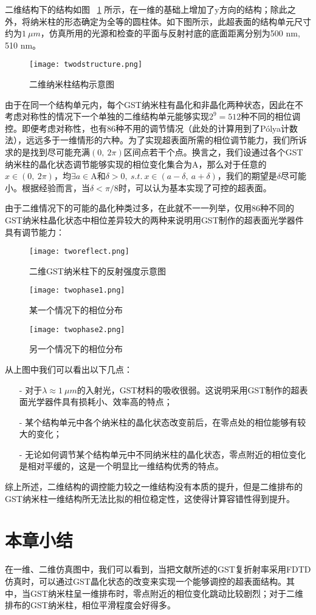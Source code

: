 二维结构下的结构如图 ~\ref{fig:twodim} 所示，在一维的基础上增加了y方向的结构；除此之外，将纳米柱的形态确定为全等的圆柱体。如下图所示，此超表面的结构单元尺寸约为$1\ \mu m$，仿真所用的光源和检查的平面与反射衬底的底面距离分别为500 nm, 510 nm。
\begin{figure}[H] %
  \centering
  \texttt{[image: twodstructure.png]}
  \caption{二维纳米柱结构示意图}
  \label{fig:twodim}
\end{figure}

由于在同一个结构单元内，每个GST纳米柱有晶化和非晶化两种状态，因此在不考虑对称性的情况下一个单独的二维结构单元能够实现$2^9=512$种不同的相位调控。即便考虑对称性，也有86种不用的调节情况（此处的计算用到了P\'olya计数法），远远多于一维情形的六种。为了实现超表面所需的相位调节能力，我们所诉求的是找到尽可能充满$\left (0,\ 2\pi \right )$区间点若干个点。换言之，我们设通过各个GST纳米柱的晶化状态调节能够实现的相位变化集合为A，那么对于任意的$x \in \left (0,\ 2\pi \right )$，均$\exists a \in \mathrm{A}\textrm{和}\delta > 0,\ s.t.\ x \in \left (a - \delta,\ a + \delta \right )$，我们的期望是$\delta$尽可能小。根据经验而言，当$\delta < \pi / 8$时，可以认为基本实现了可控的超表面。

由于二维情况下的可能的晶化种类过多，在此就不一一列举，仅用86种不同的GST纳米柱晶化状态中相位差异较大的两种来说明用GST制作的超表面光学器件具有调节能力：
\begin{figure}[h]
\begin{minipage}{0.3\textwidth}
  \centering
  \texttt{[image: tworeflect.png]}
  \caption{二维GST纳米柱下的反射强度示意图}
  \label{fig:parallel1}
\end{minipage}\hfill
\begin{minipage}{0.3\textwidth}
  \centering
  \texttt{[image: twophase1.png]}
  \caption{某一个情况下的相位分布}
  \label{fig:parallel2}
\end{minipage}\hfill
\begin{minipage}{0.3\textwidth}
  \centering
  \texttt{[image: twophase2.png]}
  \caption{另一个情况下的相位分布}
  \label{fig:parallel2}
\end{minipage}
\end{figure}

从上图中我们可以看出以下几点：
\begin{itemize}
  \item[-] 对于$\lambda \approx 1\ \mu m$的入射光，GST材料的吸收很弱。这说明采用GST制作的超表面光学器件具有损耗小、效率高的特点；
  \item[-] 某个结构单元中各个纳米柱的晶化状态改变前后，在零点处的相位能够有较大的变化；
  \item[-] 无论如何调节某个结构单元中不同纳米柱的晶化状态，零点附近的相位变化是相对平缓的，这是一个明显比一维结构优秀的特点。
\end{itemize}

综上所述，二维结构的调控能力较之一维结构没有本质的提升，但是二维排布的GST纳米柱一维结构所无法比拟的相位稳定性，这使得计算容错性得到提升。

\section{本章小结}
\label{sec:simsumup}
在一维、二维仿真图中，我们可以看到，当把文献所述的GST复折射率采用FDTD仿真时，可以通过GST晶化状态的改变来实现一个能够调控的超表面结构。其中，当GST纳米柱呈一维排布时，零点附近的相位变化跳动比较剧烈；对于二维排布的GST纳米柱，相位平滑程度会好得多。